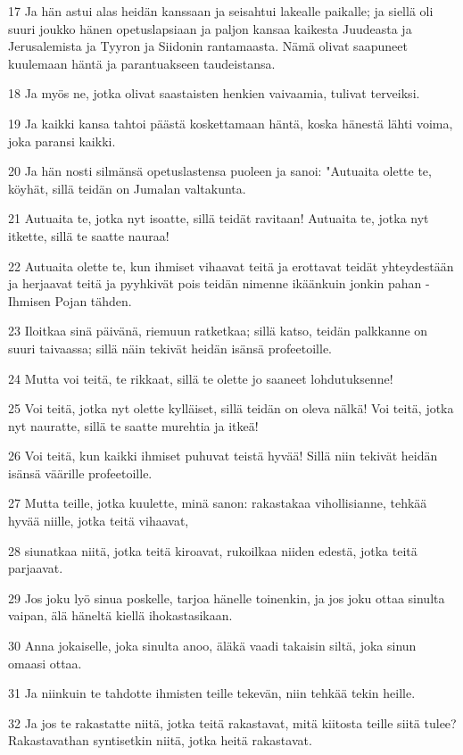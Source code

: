 \par 17 Ja hän astui alas heidän kanssaan ja seisahtui lakealle paikalle; ja siellä oli suuri joukko hänen opetuslapsiaan ja paljon kansaa kaikesta Juudeasta ja Jerusalemista ja Tyyron ja Siidonin rantamaasta. Nämä olivat saapuneet kuulemaan häntä ja parantuakseen taudeistansa.
\par 18 Ja myös ne, jotka olivat saastaisten henkien vaivaamia, tulivat terveiksi.
\par 19 Ja kaikki kansa tahtoi päästä koskettamaan häntä, koska hänestä lähti voima, joka paransi kaikki.
\par 20 Ja hän nosti silmänsä opetuslastensa puoleen ja sanoi: "Autuaita olette te, köyhät, sillä teidän on Jumalan valtakunta.
\par 21 Autuaita te, jotka nyt isoatte, sillä teidät ravitaan! Autuaita te, jotka nyt itkette, sillä te saatte nauraa!
\par 22 Autuaita olette te, kun ihmiset vihaavat teitä ja erottavat teidät yhteydestään ja herjaavat teitä ja pyyhkivät pois teidän nimenne ikäänkuin jonkin pahan - Ihmisen Pojan tähden.
\par 23 Iloitkaa sinä päivänä, riemuun ratketkaa; sillä katso, teidän palkkanne on suuri taivaassa; sillä näin tekivät heidän isänsä profeetoille.
\par 24 Mutta voi teitä, te rikkaat, sillä te olette jo saaneet lohdutuksenne!
\par 25 Voi teitä, jotka nyt olette kylläiset, sillä teidän on oleva nälkä! Voi teitä, jotka nyt nauratte, sillä te saatte murehtia ja itkeä!
\par 26 Voi teitä, kun kaikki ihmiset puhuvat teistä hyvää! Sillä niin tekivät heidän isänsä väärille profeetoille.
\par 27 Mutta teille, jotka kuulette, minä sanon: rakastakaa vihollisianne, tehkää hyvää niille, jotka teitä vihaavat,
\par 28 siunatkaa niitä, jotka teitä kiroavat, rukoilkaa niiden edestä, jotka teitä parjaavat.
\par 29 Jos joku lyö sinua poskelle, tarjoa hänelle toinenkin, ja jos joku ottaa sinulta vaipan, älä häneltä kiellä ihokastasikaan.
\par 30 Anna jokaiselle, joka sinulta anoo, äläkä vaadi takaisin siltä, joka sinun omaasi ottaa.
\par 31 Ja niinkuin te tahdotte ihmisten teille tekevän, niin tehkää tekin heille.
\par 32 Ja jos te rakastatte niitä, jotka teitä rakastavat, mitä kiitosta teille siitä tulee? Rakastavathan syntisetkin niitä, jotka heitä rakastavat.
